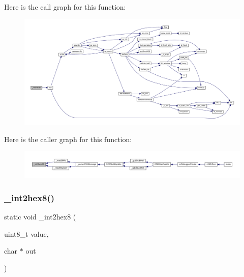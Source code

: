 Here is the call graph for this function\+:
\nopagebreak
\begin{figure}[H]
\begin{center}
\leavevmode
\includegraphics[width=350pt]{gdb-stub_8c_a77ffa276051d098347aadf57d3a8e245_cgraph}
\end{center}
\end{figure}
Here is the caller graph for this function\+:
\nopagebreak
\begin{figure}[H]
\begin{center}
\leavevmode
\includegraphics[width=350pt]{gdb-stub_8c_a77ffa276051d098347aadf57d3a8e245_icgraph}
\end{center}
\end{figure}
\mbox{\label{gdb-stub_8c_ad3195dd3a3a4e1fcdb8368c6c8372a08}} 
\subsubsection{\texorpdfstring{\+\_\+int2hex8()}{\_int2hex8()}}
{\footnotesize\ttfamily static void \+\_\+int2hex8 (\begin{DoxyParamCaption}\item[{uint8\+\_\+t}]{value,  }\item[{char $\ast$}]{out }\end{DoxyParamCaption})\hspace{0.3cm}{\ttfamily [static]}}

